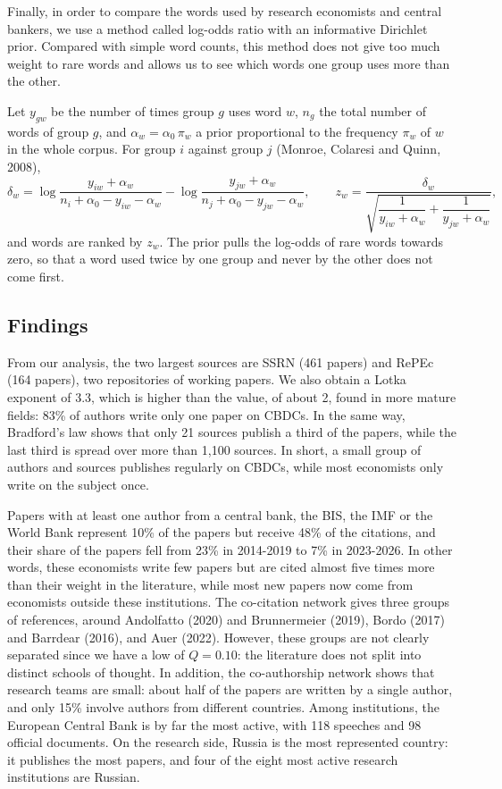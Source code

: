 \documentclass[11pt,a4paper]{article}
\begin{document}
Finally, in order to compare the words used by research economists and central bankers, we use a method called 
log-odds ratio with an informative Dirichlet prior. Compared with simple word counts, this method does not give 
too much weight to rare words and allows us to see which words one group uses more than the other.

Let $y_{gw}$ be the number of times group $g$ uses word $w$, $n_g$ the total number of words of group $g$, and $\alpha_w = \alpha_0\,\pi_w$ a prior proportional to the frequency $\pi_w$ of $w$ in the whole corpus. For group $i$ against group $j$ (Monroe, Colaresi and Quinn, 2008),
\begin{equation}\label{eq:logodds}
\delta_w = \log\frac{y_{iw}+\alpha_w}{n_i+\alpha_0-y_{iw}-\alpha_w} - \log\frac{y_{jw}+\alpha_w}{n_j+\alpha_0-y_{jw}-\alpha_w},
\qquad
z_w = \frac{\delta_w}{\sqrt{\dfrac{1}{y_{iw}+\alpha_w}+\dfrac{1}{y_{jw}+\alpha_w}}} ,
\end{equation}
and words are ranked by $z_w$. The prior pulls the log-odds of rare words towards zero, so that a word used twice by one group and never by the other does not come first.


\subsection{Findings}

From our analysis, the two 
largest sources are SSRN (461 papers) and RePEc (164 papers), two repositories of working papers. 
We also obtain a Lotka exponent of 3.3, which is higher than the value, of about 2, found in more 
mature fields: 83\% of authors write only one paper on CBDCs. In the same way, Bradford's law shows 
that only 21 sources publish a third of the papers, while the last third is spread over more than 
1,100 sources. In short, a small group of authors and sources publishes regularly on CBDCs, while 
most economists only write on the subject once.

Papers with at least one author from a central bank, the BIS, the IMF or the World Bank represent 10\% 
of the papers but receive 48\% of the citations, and their share of the papers fell from 23\% in 2014-2019 
to 7\% in 2023-2026. In other words, these economists write few papers but are cited almost five times more 
than their weight in the literature, while most new papers now come from economists outside these institutions. 
The co-citation network gives three groups of references, around Andolfatto (2020) and Brunnermeier (2019), 
Bordo (2017) and Barrdear (2016), and Auer (2022). However, these groups are not clearly separated since we 
have a low of $Q = 0.10$: the literature does not split into distinct schools of thought. In addition, the 
co-authorship network shows that research teams are small: about half of the papers are written by a single 
author, and only 15\% involve authors from different countries. Among institutions, the European Central Bank 
is by far the most active, with 118 speeches and 98 official documents. On the research side, Russia is the 
most represented country: it publishes the most papers, and four of the eight most active research institutions 
are Russian.

\end{document}
